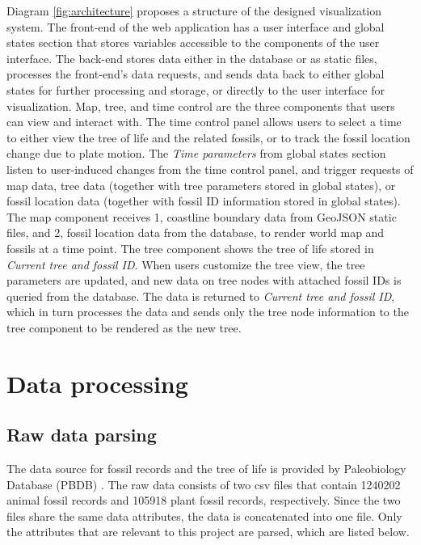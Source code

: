 \documentclass[11pt, a4paper,oneside,chapterprefix=false]{scrbook}
\begin{document}
Diagram \ref{fig:architecture} proposes a structure of the designed visualization system. The front-end of the web application has a user interface and global states section that stores variables accessible to the components of the user interface. The back-end stores data either in the database or as static files, processes the front-end's data requests, and sends data back to either global states for further processing and storage, or directly to the user interface for visualization. Map, tree, and time control are the three components that users can view and interact with. The time control panel allows users to select a time to either view the tree of life and the related fossils, or to track the fossil location change due to plate motion. The \emph{Time parameters} from global states section listen to user-induced changes from the time control panel, and trigger requests of map data, tree data (together with tree parameters stored in global states), or fossil location data (together with fossil ID information stored in global states). The map component receives 1, coastline boundary data from GeoJSON static files, and 2, fossil location data from the database, to render world map and fossils at a time point. The tree component shows the tree of life stored in \emph{Current tree and fossil ID}. When users customize the tree view, the tree parameters are updated, and new data on tree nodes with attached fossil IDs is queried from the database. The data is returned to \emph{Current tree and fossil ID}, which in turn processes the data and sends only the tree node information to the tree component to be rendered as the new tree. 

\section{Data processing} \label{sec:tec_data_processing}
\subsection{Raw data parsing} \label{subsec:raw_data_parsing}
The data source for fossil records and the tree of life is provided by Paleobiology Database (PBDB) \cite{peters2016paleobiology}. The raw data consists of two csv files that contain 1240202 animal fossil records and 105918 plant fossil records, respectively. Since the two files share the same data attributes, the data is concatenated into one file. Only the attributes that are relevant to this project are parsed, which are listed below.\\
\end{document}
